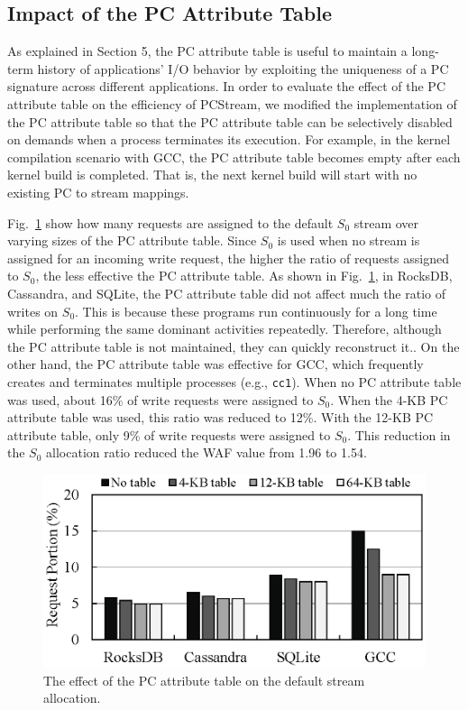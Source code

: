 \vspace{-10pt}
\subsection{Impact of the PC Attribute Table}
\vspace{-5pt}
As explained in Section 5, the PC attribute table is useful to maintain a 
long-term history of applications' I/O behavior by exploiting the  
uniqueness of a PC signature across different applications.   
In order to evaluate the effect of the PC
attribute table on the efficiency of \textsf{\small PCStream}, we modified the 
implementation of the PC attribute table so that the PC attribute table can be 
selectively disabled on demands when a process terminates its execution.  
For example, in the kernel compilation scenario with GCC, the PC attribute table 
becomes empty after each kernel build is completed.
That is, the next kernel build will start with no existing PC to stream mappings.


Fig.~\ref{fig:pctable} show how many requests are assigned to the 
default $S_{0}$ stream over varying sizes of the PC attribute table. 
Since $S_{0}$ is used when no stream is assigned for an incoming
write request, the higher the ratio of requests assigned to $S_{0}$, 
the less effective the PC attribute table.   
As shown in Fig.~\ref{fig:pctable}, in RocksDB, Cassandra, and SQLite, 
the PC attribute table did not affect much the ratio of writes on $S_{0}$. 
This is because these
programs run continuously for a long time while performing the same dominant activities repeatedly.  
Therefore, although the PC attribute table is not maintained, they can quickly reconstruct it.. 
On the other hand, the PC attribute table was effective for GCC, 
which frequently creates and terminates multiple processes (e.g., {\tt cc1}).  
When no PC attribute table was used, about 16\% of write requests were assigned to $S_{0}$.  
When the 4-KB PC attribute table was used, this ratio was reduced to 12\%.  
With the 12-KB PC attribute table, only 9\% of write requests were assigned to $S_{0}$.  
This reduction in the $S_{0}$ allocation ratio reduced the WAF value from 1.96 to 1.54.
\begin{figure}[t]
	\centering
	\includegraphics[width=0.7\linewidth]{figure/pctable}
	\caption{The effect of the PC attribute table on the default stream allocation.}
	\label{fig:pctable}
	\vspace{-20pt}
\end{figure}


